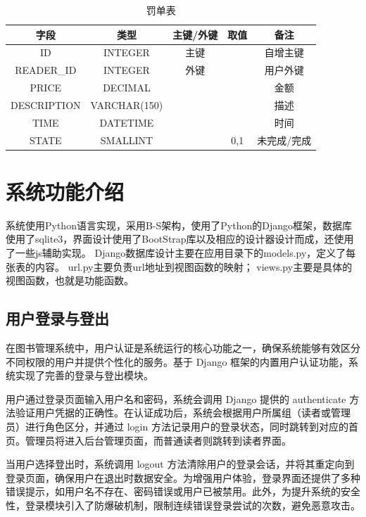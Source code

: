\documentclass[a4paper,14pt]{article}
\begin{document}
    \begin{table}[htbp]
    \centering
    \caption{罚单表}
    \begin{tabularx}{\textwidth}{|C|C|C|C|C|}
        \hline
        字段 & 类型 & 主键/外键 & 取值 & 备注 \\
        \hline
        ID & INTEGER & 主键 &  & 自增主键 \\
        \hline
        READER\_ID & INTEGER & 外键 &  & 用户外键 \\
        \hline
        PRICE & DECIMAL &  &  & 金额 \\
        \hline
        DESCRIPTION & VARCHAR(150) &  &  & 描述 \\
        \hline
        TIME & DATETIME &  &  & 时间 \\
        \hline
        STATE & SMALLINT &  & 0,1 & 未完成/完成 \\
        \hline
        \end{tabularx}
\end{table}
\FloatBarrier
\section{系统功能介绍}
系统使用Python语言实现，采用B-S架构，使用了Python的Django框架，数据库使用了sqlite3，界面设计使用了BootStrap库以及相应的设计器设计而成，还使用了一些js辅助实现。
Django数据库设计主要在应用目录下的models.py，定义了每张表的内容。
url.py主要负责url地址到视图函数的映射；
views.py主要是具体的视图函数，也就是功能函数。

\subsection{用户登录与登出} 在图书管理系统中，用户认证是系统运行的核心功能之一，确保系统能够有效区分不同权限的用户并提供个性化的服务。基于 Django 框架的内置用户认证功能，系统实现了完善的登录与登出模块。

用户通过登录页面输入用户名和密码，系统会调用 Django 提供的 authenticate\(\) 方法验证用户凭据的正确性。在认证成功后，系统会根据用户所属组（读者或管理员）进行角色区分，并通过 login\(\) 方法记录用户的登录状态，同时跳转到对应的首页。管理员将进入后台管理页面，而普通读者则跳转到读者界面。

当用户选择登出时，系统调用 logout\(\) 方法清除用户的登录会话，并将其重定向到登录页面，确保用户在退出时数据安全。为增强用户体验，登录界面还提供了多种错误提示，如用户名不存在、密码错误或用户已被禁用。此外，为提升系统的安全性，登录模块引入了防爆破机制，限制连续错误登录尝试的次数，避免恶意攻击。
\end{document}
